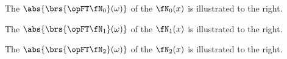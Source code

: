 \begin{minipage}{\tw-125mm}
\begin{example}
%
The  $\abs{\brs{\opFT\fN_0}(\omega)}$ of 
the  $\fN_0(x)$
is illustrated to the right.
\end{example}
\end{minipage}%
\hfill{}

\begin{minipage}{\tw-125mm}
\begin{example}
  The  $\abs{\brs{\opFT\fN_1}(\omega)}$ of the 
   $\fN_1(x)$ 
  is illustrated to the right.
\end{example}
\end{minipage}%
\hfill{}%

\begin{minipage}{\tw-125mm}
\begin{example}
  The  $\abs{\brs{\opFT\fN_2}(\omega)}$ of the 
   $\fN_2(x)$
  is illustrated to the right.
\end{example}
\end{minipage}%
\hfill{}%

